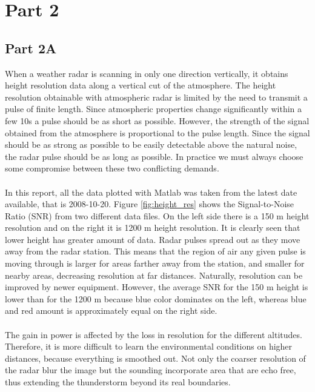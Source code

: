 \documentclass{article}
\begin{document}

\section{Part 2}


\subsection{Part 2A}

When a weather radar is scanning in only one direction vertically, it obtains height resolution data along a vertical cut of the atmosphere.\cite{Wiki:2012wr} The height resolution obtainable with atmospheric radar is limited by the need to transmit a pulse of finite length. Since atmospheric properties change significantly within a few 10s a pulse should be as short as possible. However, the strength of the signal obtained from the atmosphere is proportional to the pulse length. Since the signal should be as strong as possible to be easily detectable above the natural noise, the radar pulse should be as long as possible. In practice we must always choose some compromise between these two conflicting demands. \cite{Enmark:2012a2}\\
\\
In this report, all the data plotted with Matlab was taken from the latest date available, that is 2008-10-20. Figure \ref{fig:height_res} shows the Signal-to-Noise Ratio (SNR) from two different data files. On the left side there is a 150 m height resolution and on the right it is 1200 m height resolution. It is clearly seen that lower height has greater amount of data. Radar pulses spread out as they move away from the radar station. This means that the region of air any given pulse is moving through is larger for areas farther away from the station, and smaller for nearby areas, decreasing resolution at far distances. Naturally, resolution can be improved by newer equipment.\cite{Wiki:2012wr} However, the average SNR for the 150 m height is lower than for the 1200 m because blue color dominates on the left, whereas blue and red amount is approximately equal on the right side.\\
\\
The gain in power is affected by the loss in resolution for the different altitudes. Therefore, it is more difficult to learn the environmental conditions on higher distances, because everything is smoothed out. Not only the coarser resolution of the radar blur the image but the sounding incorporate area that are echo free, thus extending the thunderstorm beyond its real boundaries.\cite{Wiki:2012wr}
\end{document}
